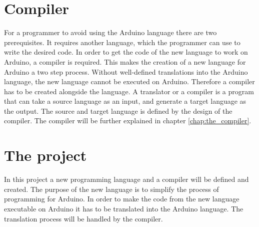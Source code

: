 \section{Compiler}
For a programmer to avoid using the Arduino language there are two prerequisites. It requires another language, which the programmer can use to write the desired code. In order to get the code of the new language to work on Arduino, a compiler is required. This makes the creation of a new language for Arduino a two step process. Without well-defined translations into the Arduino language, the new language cannot be executed on Arduino. Therefore a compiler has to be created alongside the language.
A translator or a compiler is a program that can take a source language as an input, and generate a target language as the output. The source and target language is defined by the design of the compiler. The compiler will be further explained in chapter \ref{chap:the_compiler}.

\section{The project}
In this project a new programming language and a compiler will be defined and created. The purpose of the new language is to simplify the process of programming for Arduino. In order to make the code from the new language executable on Arduino it has to be translated into the Arduino language. The translation process will be handled by the compiler. 